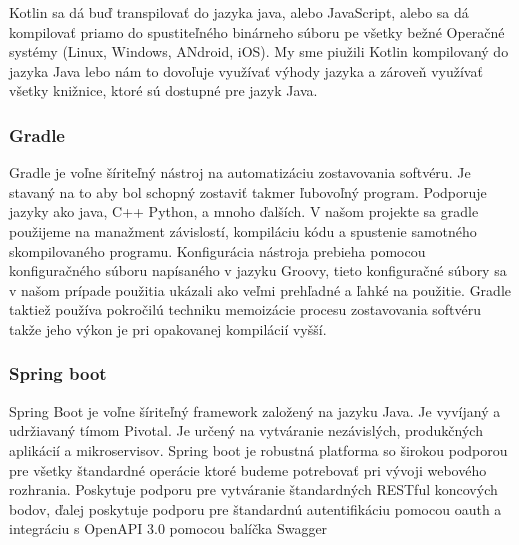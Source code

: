 Kotlin sa dá buď transpilovať do jazyka java, alebo JavaScript, alebo sa dá kompilovať priamo do spustiteľného  binárneho súboru pe všetky bežné Operačné systémy (Linux, Windows, ANdroid, iOS). 
My sme piužili Kotlin kompilovaný do jazyka Java lebo nám to dovoľuje využívať výhody jazyka a zároveň využívať všetky knižnice, ktoré sú dostupné pre jazyk Java. 

\subsubsection{Gradle}  
Gradle je voľne šíriteľný nástroj na automatizáciu zostavovania softvéru. Je stavaný na to aby bol schopný zostaviť takmer ľubovoľný program. Podporuje jazyky ako java, C++ Python, a mnoho ďalších. V našom projekte sa gradle použijeme na manažment závislostí, kompiláciu kódu a spustenie samotného skompilovaného programu. Konfigurácia nástroja prebieha pomocou konfiguračného súboru napísaného v jazyku Groovy, tieto konfiguračné  súbory sa v našom prípade použitia ukázali ako veľmi prehľadné a ľahké na použitie. Gradle taktiež používa pokročilú techniku memoizácie procesu zostavovania softvéru takže jeho výkon je pri opakovanej kompilácií vyšší. 


\subsubsection{Spring boot}  
Spring Boot je voľne šíriteľný framework založený na jazyku Java. Je vyvíjaný a udržiavaný tímom Pivotal. Je určený na vytváranie nezávislých, produkčných aplikácií a mikroservisov. Spring boot je robustná platforma so širokou podporou pre všetky štandardné operácie ktoré budeme potrebovať pri vývoji webového rozhrania. Poskytuje podporu pre vytváranie štandardných RESTful koncových bodov, ďalej poskytuje podporu pre štandardnú autentifikáciu pomocou \acrshort{oauth} a integráciu s  OpenAPI 3.0 \cite{openapi} pomocou balíčka Swagger \cite{swagger} 






